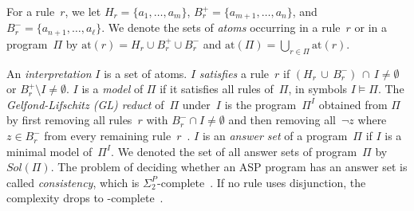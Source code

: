 \documentclass{article}
\newcommand{\Card}[1]{\left|#1\right|}
\newcommand{\SIGMA}[2]{\ensuremath{\Sigma_{\textrm{#1}}^{\textrm{#2}}}}
\newcommand{\fff}{\ensuremath{\Pi}\xspace}
\newcommand{\sol}{$Sol(\Pi)$\xspace}
\begin{document}
For a rule~$r$, we let $H_r = \{a_1, \ldots, a_m\}$,
$B^+_r = \{a_{m+1}, \ldots, a_{n}\}$, and
$B^-_r = \{a_{n+1}, \ldots, a_\ell\}$.
%
%
%
We denote the sets of \emph{atoms} occurring in a rule~$r$ or in a
program~$\Pi$ by $\text{at}(r) = H_r \cup B^+_r \cup B^-_r$ and
$\text{at}(\Pi)= \bigcup_{r\in\Pi} \text{at}(r)$.
%
%
%
%
%
%
%

An \emph{interpretation} $I$ is a set of atoms. $I$ \emph{satisfies} a
rule~$r$ if $(H_r\,\cup\, B^-_r) \,\cap\, I \neq \emptyset$ or
$B^+_r \setminus I \neq \emptyset$.  $I$ is a \emph{model} of $\Pi$
if it satisfies all rules of~$\Pi$, in symbols $I \models \Pi$. %
%
%
The \emph{Gelfond-Lifschitz
  (GL) reduct} of~$\Pi$ under~$I$ is the program~$\Pi^I$ obtained
from $\Pi$ by first removing all rules~$r$ with
$B^-_r\cap I\neq \emptyset$ and then removing all~$\neg z$ where
$z \in B^-_r$ from every remaining
rule~$r$~\cite{GelfondLifschitz91}. %
%
$I$ is an \emph{answer set} of a program~$\Pi$ if $I$ is a minimal
model of~$\Pi^I$. %
We denoted the set of all answer sets of program~$\Pi$ by \sol. %
%
The problem of deciding whether an ASP program has an answer set is called
\emph{consistency}, which is $\Sigma_2^P$-complete~\cite{EiterGottlob95}.
%
If no rule uses disjunction, the complexity drops to
-complete~\cite{BidoitFroidevaux91,MarekTruszczynski91}.
\end{document}
